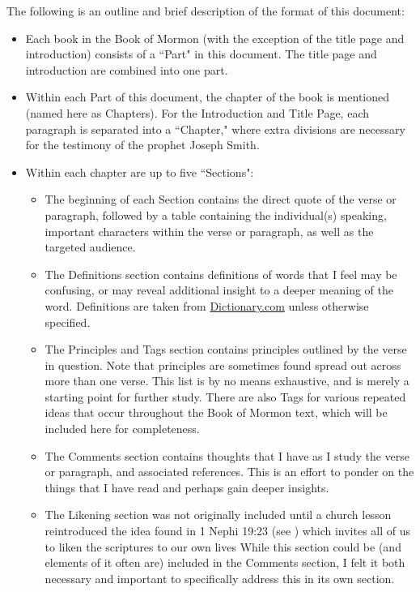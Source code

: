 \documentclass[12pt]{report}
\begin{document}
The following is an outline and brief description of the format of this document:
\begin{itemize}
\item Each book in the Book of Mormon (with the exception of the title page and introduction) consists of a ``Part" in this document.  The title page and introduction are combined into one part.
\item Within each Part of this document, the chapter of the book is mentioned (named here as Chapters).  For the Introduction and Title Page, each paragraph is separated into a ``Chapter," where extra divisions are necessary for the testimony of the prophet Joseph Smith.
\item Within each chapter are up to five ``Sections":
\begin{itemize}
\item The beginning of each Section contains the direct quote of the verse or paragraph, followed by a table containing the individual(s) speaking, important characters within the verse or paragraph, as well as the targeted audience.
\item The Definitions section contains definitions of words that I feel may be confusing, or may reveal additional insight to a deeper meaning of the word.  Definitions are taken from \href{http://www.dictionary.com}{Dictionary.com} unless otherwise specified.
\item The Principles and Tags section contains principles outlined by the verse in question.  Note that principles are sometimes found spread out across more than one verse.  This list is by no means exhaustive, and is merely a starting point for further study.  There are also Tags for various repeated ideas that occur throughout the Book of Mormon text, which will be included here for completeness.
\item The Comments section contains thoughts that I have as I study the verse or paragraph, and associated references.  This is an effort to ponder on the things that I have read and perhaps gain deeper insights.
\item The Likening section was not originally included until a church lesson reintroduced the idea found in 1 Nephi 19:23 (see ) which invites all of us to liken the scriptures to our own lives  While this section could be (and elements of it often are) included in the Comments section, I felt it both necessary and important to specifically address this in its own section.

\end{itemize}
\end{itemize}
\end{document}
